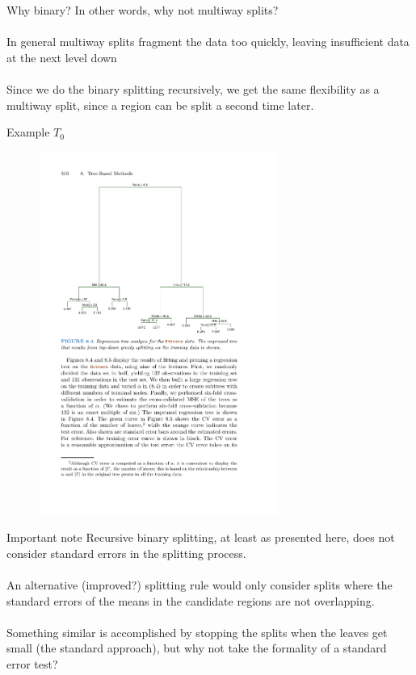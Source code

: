 \documentclass[mathserif, aspectratio=169]{beamer}
\begin{document}
\begin{frame}{Why binary?}
In other words, why not multiway splits?\\~\\

\pause
In general multiway splits fragment the data too quickly, leaving insufficient data at the next level down\\~\\

Since we do the binary splitting recursively, we get the same flexibility as a multiway split, since a region can be split a second time later.
\end{frame}

\begin{frame}{Example $T_0$}
\begin{figure}
\includegraphics[width=0.7\textwidth]{complex_tree}
\caption*{}
\end{figure}
\end{frame}

\begin{frame}{Important note}
Recursive binary splitting, at least as presented here, does not consider standard errors in the splitting process.  \\~\\

An alternative (improved?) splitting rule would only consider splits where the standard errors of the means in the candidate regions are not overlapping.\\~\\

Something similar is accomplished by stopping the splits when the leaves get small (the standard approach), but why not take the formality of a standard error test?
\end{frame}
\end{document}
